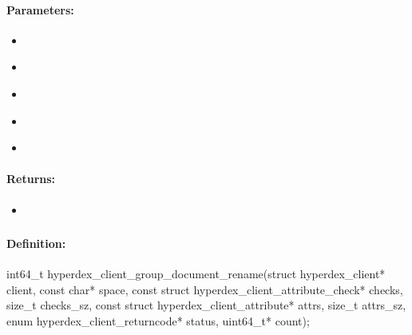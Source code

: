 \paragraph{Parameters:}
\begin{itemize}[noitemsep]
\item {}\\

\item {}\\

\item {}\\

\item {}\\

\item {}\\

\end{itemize}

\paragraph{Returns:}
\begin{itemize}[noitemsep]
\item {}\\

\end{itemize}

\pagebreak
\subsubsection{}
\label{api:c:group_document_rename}


\paragraph{Definition:}
\begin{ccode}
int64_t hyperdex_client_group_document_rename(struct hyperdex_client* client,
        const char* space,
        const struct hyperdex_client_attribute_check* checks, size_t checks_sz,
        const struct hyperdex_client_attribute* attrs, size_t attrs_sz,
        enum hyperdex_client_returncode* status,
        uint64_t* count);
\end{ccode}

